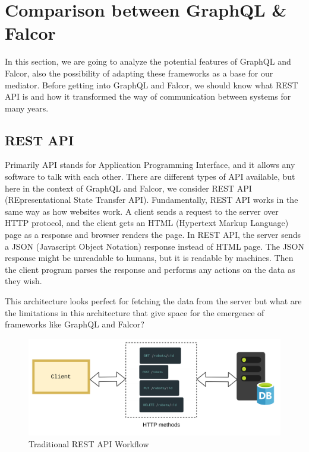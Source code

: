 

    \section{Comparison between GraphQL \& Falcor} \label{sec:graphql_falcor}
	In this section, we are going to analyze the potential features of GraphQL and Falcor, also the possibility of adapting these frameworks as a base for our mediator. Before getting into GraphQL and Falcor, we should know what REST API is and how it transformed the way of communication between systems for many years.
    \subsection{REST API}
	Primarily API stands for Application Programming Interface, and it allows any software to talk with each other. There are different types of API available, but here in the context of GraphQL and Falcor, we consider REST API (REpresentational State Transfer API).  Fundamentally, REST API works in the same way as how websites work. A client sends a request to the server over HTTP protocol, and the client gets an HTML (Hypertext Markup Language) page as a response and browser renders the page. In REST API, the server sends a JSON (Javascript Object Notation) response instead of HTML page. The JSON response might be unreadable to humans, but it is readable by machines. Then the client program parses the response and performs any actions on the data as they wish. 

	This architecture looks perfect for fetching the data from the server but what are the limitations in this architecture that give space for the emergence of frameworks like GraphQL and Falcor?
	
	\begin{figure}[!htbp] 
		\begin{center}
			\includegraphics[trim={0 0 0 2cm},clip,scale=0.105]{./images/png/rest_workflow}	
			\caption{Traditional REST API Workflow}	
			\label{fig:rest_workflow}	
		\end{center}
	\end{figure}
	
